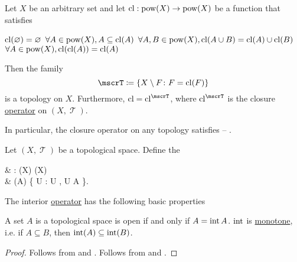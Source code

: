 \begin{proposition}\label{thm:closure_operator_axioms}
  Let \( X \) be an arbitrary set and let \( \operatorname{cl}: \operatorname{pow}(X) \to \operatorname{pow}(X) \) be a function that satisfies
  \begin{PropEnum}
     \( \operatorname{cl}(\varnothing) = \varnothing \)
     \( \forall A \in \operatorname{pow}(X), A \subseteq \operatorname{cl}(A) \)
     \( \forall A, B \in \operatorname{pow}(X), \operatorname{cl}(A \cup B) = \operatorname{cl}(A) \cup \operatorname{cl}(B) \)
     \( \forall A \in \operatorname{pow}(X), \operatorname{cl}(\operatorname{cl}(A)) = \operatorname{cl}(A) \)
  \end{PropEnum}

  Then the family
  \begin{equation*}
    \mscrT \coloneqq \{ X \setminus F \colon F = \Cl(F) \}
  \end{equation*}
  is a topology on \( X \). Furthermore, \( \Cl = \Cl^{\mscrT} \), where \( \Cl^{\mscrT} \) is the closure \hyperref[def:closure_operator]{operator} on \( (X, \mscrT) \).

  In particular, the closure operator on any topology satisfies  -- .
\end{proposition}

\begin{definition}\label{def:interior_operator}
  Let \( (X, \mscrT) \) be a topological space. Define the 
  \begin{BreakableAlign*}
     & \Int: \Pow(X) \to \Pow(X)                                     \\
     & \Int(A) \coloneqq \bigcup \{ U : U \in \mscrT, U \subseteq A \}.
  \end{BreakableAlign*}
\end{definition}

\begin{proposition}\label{thm:interior_operator_properties}
  The interior \hyperref[def:interior_operator]{operator} has the following basic properties
  \begin{PropEnum}
     A set \( A \) is a topological space is open if and only if \( A = \operatorname{int} A \).
     \( \operatorname{int} \) is \hyperref[def:monotone_map]{monotone}, i.e. if \( A \subseteq B \), then \( \operatorname{int}(A) \subseteq \operatorname{int}(B) \).
  \end{PropEnum}
\end{proposition}
\begin{proof}
   Follows from  and .
   Follows from  and .
\end{proof}

